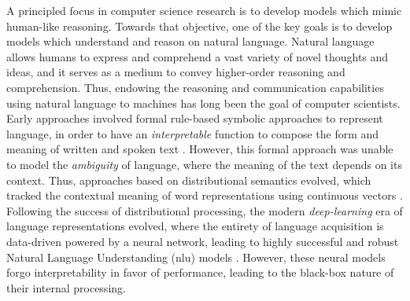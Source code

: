 \documentclass[letterpaper, 12pt]{report}
\begin{document}
A principled focus in computer science research is to develop models which mimic human-like reasoning. Towards that objective, one of the key goals is to develop models which understand and reason on natural language. Natural language allows humans to express and comprehend a vast variety of novel thoughts and ideas, and it serves as a medium to convey higher-order reasoning and comprehension. Thus, endowing the reasoning and communication capabilities using natural language to machines has long been the goal of computer scientists. Early approaches involved formal rule-based symbolic approaches to represent language, in order to have an \textit{interpretable} function to compose the form and meaning of written and spoken text \citep{chomsky1957syntactic,van1995language,van2008brief,MacCartney2009-sz}. However, this formal approach was unable to model the \textit{ambiguity} of language, where the meaning of the text depends on its context. Thus, approaches based on distributional semantics evolved, which tracked the contextual meaning of word representations using continuous vectors \citep{mikolov2013efficient,pennington2014glove}. Following the success of distributional processing, the modern \textit{deep-learning} era of language representations evolved, where the entirety of language acquisition is data-driven powered by a neural network, leading to highly successful and robust Natural Language Understanding (\acrshort{nlu}) models \citep{rosenblatt1958perceptron,rumelhart1985learning,hinton2006fast,bengio2006greedy,hochreiter1997long,cho2014learning,kim-2014-convolutional,bahdanau2014neural}. However, these neural models forgo interpretability in favor of performance, leading to the black-box nature of their internal processing.

\end{document}

